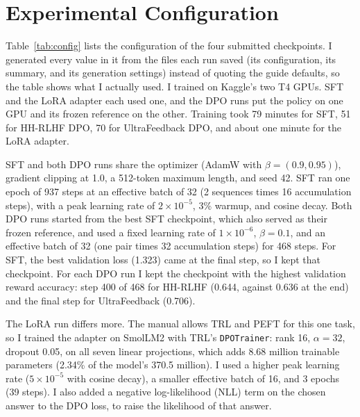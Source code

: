 \section{Experimental Configuration}
\label{sec:config}

Table~\ref{tab:config} lists the configuration of the four submitted checkpoints. I generated every value in it from the files each run saved (its configuration, its summary, and its generation settings) instead of quoting the guide defaults, so the table shows what I actually used. I trained on Kaggle's two T4 GPUs. SFT and the LoRA adapter each used one, and the DPO runs put the policy on one GPU and its frozen reference on the other. Training took 79 minutes for SFT, 51 for HH-RLHF DPO, 70 for UltraFeedback DPO, and about one minute for the LoRA adapter.

\begin{table}[H]
\centering
\caption{Configuration of the four submitted checkpoints. ``Kept'' marks the checkpoint I submitted.}
\label{tab:config}

\end{table}

SFT and both DPO runs share the optimizer (AdamW with $\beta=(0.9,0.95)$), gradient clipping at 1.0, a 512-token maximum length, and seed 42. SFT ran one epoch of 937 steps at an effective batch of 32 (2 sequences times 16 accumulation steps), with a peak learning rate of $2\times10^{-5}$, 3\% warmup, and cosine decay. Both DPO runs started from the best SFT checkpoint, which also served as their frozen reference, and used a fixed learning rate of $1\times10^{-6}$, $\beta=0.1$, and an effective batch of 32 (one pair times 32 accumulation steps) for 468 steps. For SFT, the best validation loss (1.323) came at the final step, so I kept that checkpoint. For each DPO run I kept the checkpoint with the highest validation reward accuracy: step 400 of 468 for HH-RLHF (0.644, against 0.636 at the end) and the final step for UltraFeedback (0.706).

The LoRA run differs more. The manual allows TRL and PEFT for this one task, so I trained the adapter on SmolLM2 with TRL's \texttt{DPOTrainer}: rank 16, $\alpha=32$, dropout 0.05, on all seven linear projections, which adds 8.68 million trainable parameters (2.34\% of the model's 370.5 million). I used a higher peak learning rate ($5\times10^{-5}$ with cosine decay), a smaller effective batch of 16, and 3 epochs (39 steps). I also added a negative log-likelihood (NLL) term on the chosen answer to the DPO loss, to raise the likelihood of that answer.

